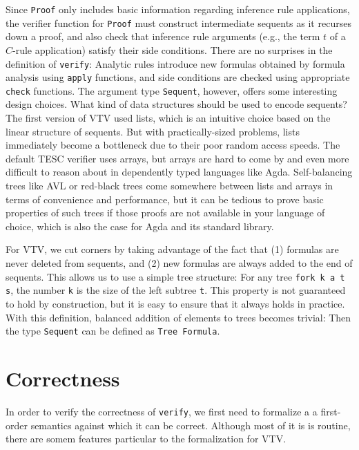 \documentclass[12pt]{article}
\begin{document}
Since \verb|Proof| only includes basic information regarding inference rule 
applications, the verifier function for \verb|Proof| must construct 
intermediate sequents as it recurses down 
a proof, and also check that inference rule arguments (e.g., the term $t$ 
of a $C$-rule application) satisfy their side conditions. There are no 
surprises in the definition of \verb|verify|: 
Analytic rules introduce new formulas obtained by formula analysis using 
\verb|apply| functions, and side conditions are checked using appropriate 
\verb|check| functions. The argument type \verb|Sequent|, however, offers 
some interesting design choices. What kind of data structures should be 
used to encode sequents? The first version of VTV used lists, which
is an intuitive choice based on the linear structure of sequents. But with 
practically-sized problems, lists immediately become a bottleneck due to 
their poor random access speeds. The default TESC verifier uses arrays, 
but arrays are hard to come by and even more difficult to reason about in 
dependently typed languages like Agda. Self-balancing trees like AVL or 
red-black trees come somewhere between lists and arrays in terms of 
convenience and performance, but it can be tedious to prove basic properties 
of such trees if those proofs are not available in your language of 
choice, which is also the case for Agda and its standard library.

For VTV, we cut corners by taking advantage of the fact that (1) formulas 
are never deleted from sequents, and (2) new formulas are always added to the 
end of sequents. This allows us to use a simple tree structure:
For any tree \verb|fork k a t s|, the number \verb|k| is the size of the  
left subtree \verb|t|. This property is not guaranteed to hold by construction,
but it is easy to ensure that it always holds in practice. With this definition,
balanced addition of elements to trees becomes trivial:
Then the type \verb|Sequent| can be defined as \verb|Tree Formula|.



\section{Correctness} \label{sec:correctness}

In order to verify the correctness of \verb|verify|, we first need to formalize a 
a first-order semantics against which it can be correct. Although most of it is 
is routine, there are somem features particular to the formalization for VTV.
\end{document}
